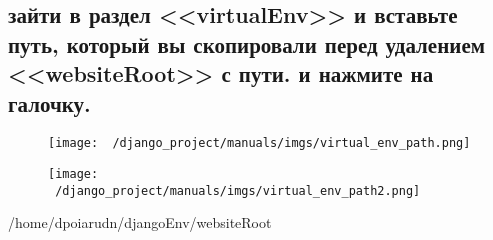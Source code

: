 \documentclass[12pt]{article}
\begin{document}
  \subsection{зайти в раздел <<virtualEnv>> и вставьте путь, который вы скопировали перед удалением <<websiteRoot>> с пути. и нажмите на галочку.}
	\begin{figure}[H]
		\centering
		\texttt{[image: ~/django\_project/manuals/imgs/virtual\_env\_path.png]}
		\caption{}
	\end{figure}
	\begin{figure}[H]
		\centering
		\texttt{[image: ~/django\_project/manuals/imgs/virtual\_env\_path2.png]}
		\caption{}
	\end{figure}
  /home/dpoiarudn/djangoEnv/websiteRoot
\end{document}
